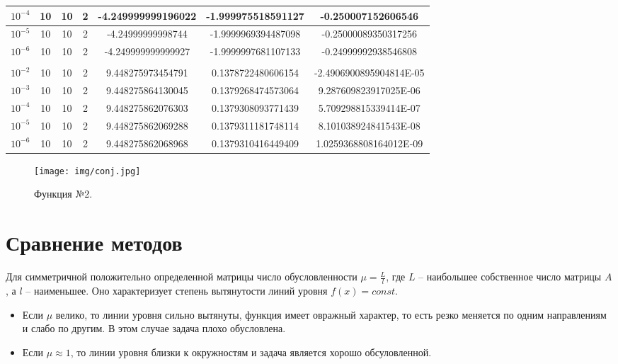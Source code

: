 \documentclass[12pt]{article}
\begin{document}
\begin{table}[H]
\begin{tabular}{|c|c|c|c|c|c|c|}
$10^{-4}$ & 10 & 10 & 2 & -4.249999999196022  & -1.999975518591127  & -0.250007152606546      \\ \hline
$10^{-5}$ & 10 & 10 & 2 & -4.24999999998744   & -1.9999969394487098 & -0.25000089350317256    \\ \hline
$10^{-6}$ & 10 & 10 & 2 & -4.249999999999927  & -1.9999997681107133 & -0.24999992938546808    \\ \hline
\rowcolor[HTML]{FFF0DB} 
\multicolumn{7}{|c|}{\cellcolor[HTML]{FFF0DB}$29x^2+18y^2-8x+10$}                             \\ \hline
$10^{-2}$ & 10 & 10 & 2 & 9.448275973454791   & 0.1378722480606154  & -2.4906900895904814E-05 \\ \hline
$10^{-3}$ & 10 & 10 & 2 & 9.448275864130045   & 0.1379268474573064  & 9.287609823917025E-06   \\ \hline
$10^{-4}$ & 10 & 10 & 2 & 9.448275862076303   & 0.1379308093771439  & 5.709298815339414E-07   \\ \hline
$10^{-5}$ & 10 & 10 & 2 & 9.448275862069288   & 0.1379311181748114  & 8.101038924841543E-08   \\ \hline
$10^{-6}$ & 10 & 10 & 2 & 9.448275862068968   & 0.1379310416449409  & 1.0259368808164012E-09  \\ \hline
\end{tabular}
\end{table}

\begin{figure}[H]
	\centering
	\texttt{[image: img/conj.jpg]}
	\caption{Функция №2.}
\end{figure}

\newpage
\section{Сравнение методов}

Для симметричной положительно определенной матрицы число обусловленности $\mu = \frac{L}{l}$, где $L$ -- наибольшее собственное число матрицы $A$, а $l$ -- наименьшее. Оно характеризует степень вытянутости линий уровня $f(x) = const$.

\begin{itemize}
\item Если $\mu$ велико, то линии уровня сильно вытянуты, функция имеет овражный характер, то есть резко меняется по одним направлениям и слабо по другим. В этом случае задача плохо обусловлена.
\item Если $\mu \approx 1$, то линии уровня близки к окружностям и задача является хорошо обсуловленной.
\end{itemize}
\end{document}
